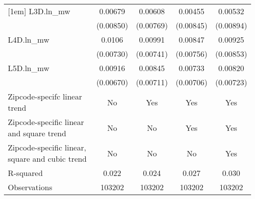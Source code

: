 {\begin{tabular}{l*{4}{c}}
[1em]
L3D.ln\_mw &  0.00679         &  0.00608         &  0.00455         &  0.00532         \\
          &(0.00850)         &(0.00769)         &(0.00845)         &(0.00894)         \\
[1em]
L4D.ln\_mw &   0.0106         &  0.00991         &  0.00847         &  0.00925         \\
          &(0.00730)         &(0.00741)         &(0.00756)         &(0.00853)         \\
[1em]
L5D.ln\_mw &  0.00916         &  0.00845         &  0.00733         &  0.00820         \\
          &(0.00670)         &(0.00711)         &(0.00706)         &(0.00723)         \\
\hline
Zipcode-specifc linear trend&       No         &      Yes         &      Yes         &      Yes         \\
Zipcode-specific linear and square trend&       No         &       No         &      Yes         &      Yes         \\
Zipcode-specific linear, square and cubic trend&       No         &       No         &       No         &      Yes         \\
R-squared &    0.022         &    0.024         &    0.027         &    0.030         \\
Observations&   103202         &   103202         &   103202         &   103202         \\
\hline\hline
\end{tabular}
}
